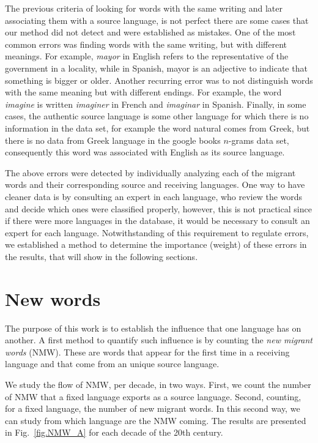 \documentclass[10pt,letterpaper]{article} %
\newcommand{\Fref}[1]{Fig.~\ref{#1}}
\begin{document}
The previous criteria of looking for words with the same writing and later
associating them with a source language, is not perfect there are some cases
that our method did not detect and were established as mistakes. One of the
most common errors was finding words with the same writing, but with different
meanings. For example,  \textit{mayor} in English refers to the representative
of the government in a locality, while in Spanish, mayor is an
adjective to indicate that something is bigger or older.  Another recurring
error was to not distinguish words with the same meaning but with different
endings. For example, the word \textit{imagine} is written \textit{imaginer} in
French and \textit{imaginar} in Spanish.  Finally, in some cases, the authentic
source language is some other language for which there is no information in the
data set, for example the word  natural comes from Greek, but there is no data
from Greek language in the google books $n$-grams data set, consequently this
word was associated with English as its source language.

The above errors were detected by individually analyzing each of the migrant
words and their corresponding source and receiving languages. One way to have
cleaner data is by consulting an expert in each language, who review the words
and decide which ones were classified properly, however, this is not practical
since if there were more languages in the database, it would be necessary to
consult an expert for each language. Notwithstanding of this requirement to
regulate errors, we established a method to determine the importance (weight)
of these errors in the results, that will show in the following sections. 
\section*{New words} %
 
The purpose of this work is to establish the influence that one language has on
another. A first method to quantify such influence is by counting the
\textit{new migrant words} (NMW). These are words that appear for the first time in a
receiving language and that come from an unique  source language.


We study the flow of NMW, per decade, in two ways. First, we
count the number of NMW that a fixed language exports as a source
language. Second, counting, for a fixed language, the number
of new migrant words. In this second way, we can study from 
which language are the NMW coming. The results are presented in 
\Fref{fig.NMW_A} for each decade of the 20th century. 
\end{document}
